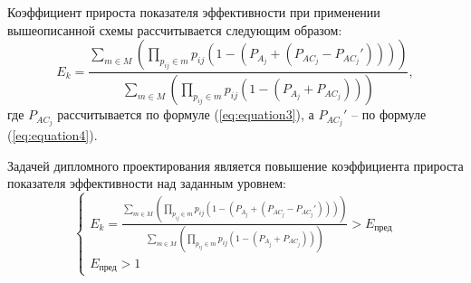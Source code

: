 \vspace{\baselineskip}
Коэффициент прироста показателя эффективности при применении вышеописанной схемы рассчитывается следующим образом:
$$
E_k=\frac{\sum_{m \in M} (\prod_{p_{ij} \in m} p_{ij}(1-(P_{A_j}+(P_{{AC}_j}-P_{{AC}_j}'))))}{\sum_{m \in M} (\prod_{p_{ij} \in m} p_{ij}(1-(P_{A_j}+P_{{AC}_j})))},
$$
где $P_{{AC}_j}$ рассчитывается по формуле (\ref{eq:equation3}), а $P_{{AC}_j}'$ -- по формуле (\ref{eq:equation4}).

\vspace{\baselineskip}
Задачей дипломного проектирования является повышение коэффициента прироста показателя  эффективности над заданным уровнем:
$$
\begin{cases}
   E_k=\frac{\sum_{m \in M} (\prod_{p_{ij} \in m} p_{ij}(1-(P_{A_j}+(P_{{AC}_j}-P_{{AC}_j}'))))}{\sum_{m \in M} (\prod_{p_{ij} \in m} p_{ij}(1-(P_{A_j}+P_{{AC}_j})))} > E_{\textrm{пред}} \\
   E_{\textrm{пред}} > 1
  \end{cases}
$$
\clearpage